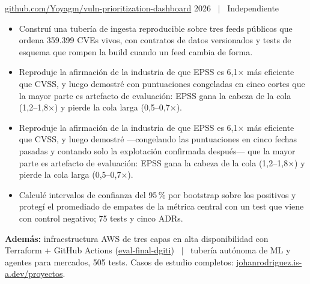 %
  {\href{https://github.com/Yoyagm/vuln-prioritization-dashboard}{github.com/Yoyagm/vuln-prioritization-dashboard}}%
  {2026 \ $\vert$ \ Independiente}
\begin{itemize}
  \item Construí una tubería de ingesta reproducible sobre tres feeds públicos que ordena 359.399
        CVEs vivos, con contratos de datos versionados y tests de esquema que rompen la build
        cuando un feed cambia de forma.
  \ifonepage
  \item Reproduje la afirmación de la industria de que EPSS es 6,1$\times$ más eficiente que CVSS,
        y luego demostré con puntuaciones congeladas en cinco cortes que la mayor parte es
        artefacto de evaluación: EPSS gana la cabeza de la cola (1,2--1,8$\times$) y pierde la cola
        larga (0,5--0,7$\times$).
  \else
  \item Reproduje la afirmación de la industria de que EPSS es 6,1$\times$ más eficiente que CVSS,
        y luego demostré ---congelando las puntuaciones en cinco fechas pasadas y contando solo la
        explotación confirmada después--- que la mayor parte es artefacto de evaluación: EPSS gana la
        cabeza de la cola (1,2--1,8$\times$) y pierde la cola larga (0,5--0,7$\times$).
  \item Calculé intervalos de confianza del 95\,\% por bootstrap sobre los positivos y protegí el
        promediado de empates de la métrica central con un test que viene con control negativo;
        75 tests y cinco ADRs.
  \fi
\end{itemize}

\ifonepage
\vspace{0.6ex}
{\footnotesize\noindent\textbf{Además:} infraestructura AWS de tres capas en alta disponibilidad con
Terraform + GitHub Actions
(\href{https://github.com/Yoyagm/eval-final-dgiti}{eval-final-dgiti}) \ $\vert$ \ tubería autónoma
de ML y agentes para mercados, 505 tests. Casos de estudio completos:
\href{https://johanrodriguez.is-a.dev/es/proyectos}{johanrodriguez.is-a.dev/proyectos}.\par}
\else

